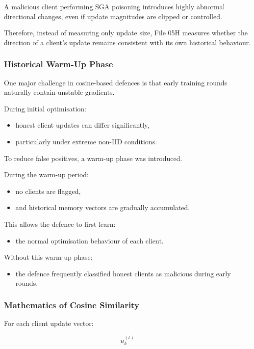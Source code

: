 A malicious client performing SGA poisoning introduces highly abnormal directional changes, even if update magnitudes are clipped or controlled.

Therefore, instead of measuring only update size, File 05H measures whether the direction of a client's update remains consistent with its own historical behaviour.

\subsubsection*{Historical Warm-Up Phase}

One major challenge in cosine-based defences is that early training rounds naturally contain unstable gradients.

During initial optimisation:
\begin{itemize}
    \item honest client updates can differ significantly,
    \item particularly under extreme non-IID conditions.
\end{itemize}

To reduce false positives, a warm-up phase was introduced.

During the warm-up period:
\begin{itemize}
    \item no clients are flagged,
    \item and historical memory vectors are gradually accumulated.
\end{itemize}

This allows the defence to first learn:
\begin{itemize}
    \item the normal optimisation behaviour of each client.
\end{itemize}

Without this warm-up phase:
\begin{itemize}
    \item the defence frequently classified honest clients as malicious during early rounds.
\end{itemize}

\subsubsection*{Mathematics of Cosine Similarity}

For each client update vector:

\[
u_k^{(t)}
\]

